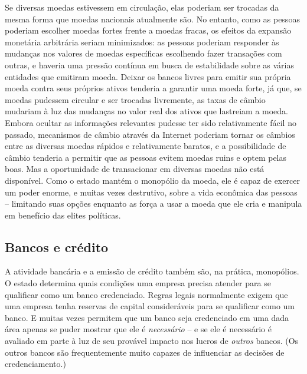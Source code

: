 Se diversas moedas estivessem em circulação, elas poderiam ser trocadas da mesma forma que moedas nacionais atualmente são. No entanto, como as pessoas poderiam escolher moedas fortes frente a moedas fracas, os efeitos da expansão monetária arbitrária seriam minimizados: as pessoas poderiam responder às mudanças nos valores de moedas específicas escolhendo fazer transações com outras, e haveria uma pressão contínua em busca de estabilidade sobre as várias entidades que emitiram moeda. Deixar os bancos livres para emitir sua própria moeda contra seus próprios ativos tenderia a garantir uma moeda forte, já que, se moedas pudessem circular e ser trocadas livremente, as taxas de câmbio mudariam à luz das mudanças no valor real dos ativos que lastreiam a moeda. Embora ocultar as informações relevantes pudesse ter sido relativamente fácil no passado, mecanismos de câmbio através da Internet poderiam tornar os câmbios entre as diversas moedas rápidos e relativamente baratos, e a possibilidade de câmbio tenderia a permitir que as pessoas evitem moedas ruins e optem pelas boas. Mas a oportunidade de transacionar em diversas moedas não está disponível. Como o estado mantém o monopólio da moeda, ele é capaz de exercer um poder enorme, e muitas vezes destrutivo, sobre a vida econômica das pessoas -- limitando suas opções enquanto as força a usar a moeda que ele cria e manipula em benefício das elites políticas.

\subsection*{Bancos e crédito}

A atividade bancária e a emissão de crédito também são, na prática, monopólios. O estado determina quais condições uma empresa precisa atender para se qualificar como um banco credenciado. Regras legais normalmente exigem que uma empresa tenha reservas de capital consideráveis para se qualificar como um banco. E muitas vezes permitem que um banco seja credenciado em uma dada área apenas se puder mostrar que ele é \emph{necessário} -- e se ele é necessário é avaliado em parte à luz de seu provável impacto nos lucros de \emph{outros} bancos. (Os outros bancos são frequentemente muito capazes de influenciar as decisões de credenciamento.)


